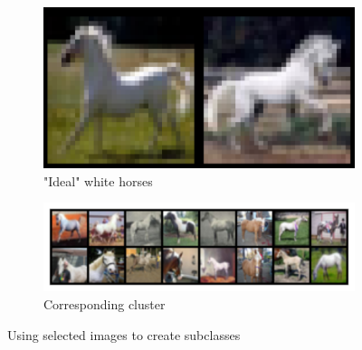 \documentclass{article}
\begin{document}
\begin{figure}
    \begin{center}
    \begin{subfigure}{.2\textwidth}
    \begin{center}
        \includegraphics[width=.95\textwidth]{figures/good_horses_cropped.png}
    \end{center}
    \caption{"Ideal" white horses}
\end{subfigure}
\begin{subfigure}{.7\textwidth}
    \begin{center}
        \includegraphics[width=.95\textwidth]{figures/white_horse_class.png}
    \end{center}
    \caption{Corresponding cluster}
\end{subfigure}
\caption{Using selected images to create subclasses}
    \label{fig:good_horses}
\end{center}
\end{figure}
\end{document}
